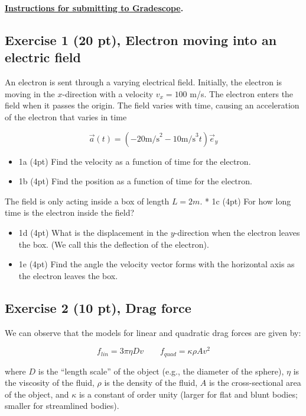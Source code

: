 \documentclass[11pt]{article}
\begin{document}
\textbf{\href{../resources/gradescope-submissions.md}{Instructions for
submitting to Gradescope}.}

    \subsection{Exercise 1 (20 pt), Electron moving into an electric
field}\label{exercise-1-20-pt-electron-moving-into-an-electric-field}

An electron is sent through a varying electrical field. Initially, the
electron is moving in the \(x\)-direction with a velocity \(v_x = 100\)
m/s. The electron enters the field when it passes the origin. The field
varies with time, causing an acceleration of the electron that varies in
time

    \[
\vec{a}(t)=\left(-20\mathrm{m/s}^2-10\mathrm{m/s}^3t\right) \vec{e}_y
\]

    \begin{itemize}
\item
  1a (4pt) Find the velocity as a function of time for the electron.
\item
  1b (4pt) Find the position as a function of time for the electron.
\end{itemize}

The field is only acting inside a box of length \(L = 2m\). * 1c (4pt)
For how long time is the electron inside the field?

\begin{itemize}
\item
  1d (4pt) What is the displacement in the \(y\)-direction when the
  electron leaves the box. (We call this the deflection of the
  electron).
\item
  1e (4pt) Find the angle the velocity vector forms with the horizontal
  axis as the electron leaves the box.
\end{itemize}

    \subsection{Exercise 2 (10 pt), Drag
force}\label{exercise-2-10-pt-drag-force}

We can observe that the models for linear and quadratic drag forces are
given by:

\[f_{lin} = 3\pi \eta D v \qquad f_{quad} = \kappa \rho A v^2\]

where \(D\) is the ``length scale'' of the object (e.g., the diameter of
the sphere), \(\eta\) is the viscosity of the fluid, \(\rho\) is the
density of the fluid, \(A\) is the cross-sectional area of the object,
and \(\kappa\) is a constant of order unity (larger for flat and blunt
bodies; smaller for streamlined bodies).
\end{document}
